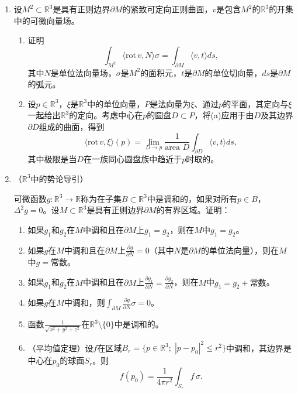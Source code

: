 \documentclass[12pt,a4paper]{ctexbook}
\begin{document}
\begin{enumerate}
    \item 设$M^2\subset\mathbb{R}^3$是具有正则边界$\partial M$的紧致可定向正则曲面，$v$是包含$M^2$的$\mathbb{R}^3$的开集中的可微向量场。
    \begin{enumerate}[label=\alph*)]
        \item 证明
        $$\int_{M^2} \langle \text{rot}\,v, N\rangle\sigma = \int_{\partial M} \langle v, t\rangle ds,$$
        其中$N$是单位法向量场，$\sigma$是$M^2$的面积元，$t$是$\partial M$的单位切向量，$ds$是$\partial M$的弧元。
        
        \item 设$p\in\mathbb{R}^3$，$\xi$是$\mathbb{R}^3$中的单位向量，$P$是法向量为$\xi$、通过$p$的平面，其定向与$\xi$一起给出$\mathbb{R}^3$的定向。考虑中心在$p$的圆盘$D\subset P$，将(a)应用于由$D$及其边界$\partial D$组成的曲面，得到
        $$\langle \text{rot}\,v, \xi\rangle(p) = \lim_{D\to p} \frac{1}{\text{area } D} \int_{\partial D} \langle v, t\rangle ds,$$
        其中极限是当$D$在一族同心圆盘族中趋近于$p$时取的。
    \end{enumerate}
    
    \item （$\mathbb{R}^3$中的势论导引）
    
    可微函数$g:\mathbb{R}^3\to\mathbb{R}$称为在子集$B\subset\mathbb{R}^3$中是调和的，如果对所有$p\in B$，$\Delta^2 g = 0$。设$M\subset\mathbb{R}^3$是具有正则边界$\partial M$的有界区域。证明：
    \begin{enumerate}[label=\alph*)]
        \item 如果$g_1$和$g_2$在$M$中调和且在$\partial M$上$g_1=g_2$，则在$M$中$g_1=g_2$。
        
        \item 如果$g$在$M$中调和且在$\partial M$上$\frac{\partial g}{\partial N} = 0$（其中$N$是$\partial M$的单位法向量），则在$M$中$g=\text{常数}$。
        
        \item 如果$g_1$和$g_2$在$M$中调和且在$\partial M$上$\frac{\partial g_1}{\partial N} = \frac{\partial g_2}{\partial N}$，则在$M$中$g_1 = g_2 + \text{常数}$。
        
        \item 如果$g$在$M$中调和，则$\int_{\partial M} \frac{\partial g}{\partial N}\sigma = 0$。
        
        \item 函数$\frac{1}{\sqrt{x^2+y^2+z^2}}$在$\mathbb{R}^3\setminus\{0\}$中是调和的。
        
        \item （平均值定理）设$f$在区域$B_r = \{p\in\mathbb{R}^3;\; |p-p_0|^2\leq r^2\}$中调和，其边界是中心在$p_0$的球面$S_r$。则
        $$f(p_0) = \frac{1}{4\pi r^2}\int_{S_r} f\,\sigma.$$
        

\end{enumerate}
\end{enumerate}
\end{document}
